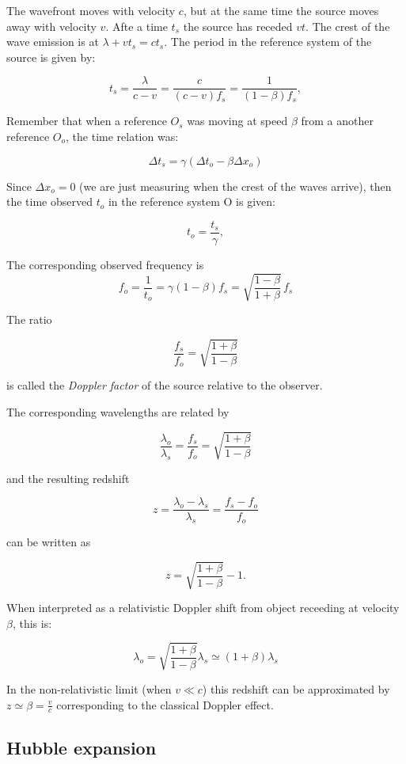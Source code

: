 \documentclass[
  letterpaper,
  DIV=11,
  numbers=noendperiod]{scrreprt}
\begin{document}
The wavefront moves with velocity \(c\), but at the same time the source
moves away with velocity \(v\). Afte a time \(t_s\) the source has
receded \(vt\). The crest of the wave emission is at
\(\lambda+v t_s=ct_s\). The period in the reference system of the source
is given by:

\[t_s = \frac{\lambda}{c-v} = \frac{c}{(c-v)f_s} = \frac{1}{(1-\beta)f_s},\]

Remember that when a reference \(O_s\) was moving at speed \(\beta\)
from a another reference \(O_{o}\), the time relation was:

\[\Delta t_s = \gamma(\Delta t_{o} - \beta \Delta x_{o})\]

Since \(\Delta x_{o} =0\) (we are just measuring when the crest of the
waves arrive), then the time observed \(t_{o}\) in the reference system
O is given:

\[t_o = \frac{t_s}{\gamma},\]

The corresponding observed frequency is
\[f_o = \frac{1}{t_o} = \gamma (1-\beta) f_s = \sqrt{\frac{1-\beta}{1+\beta}}\,f_s\]

The ratio

\[\frac{f_s}{f_o} = \sqrt{\frac{1+\beta}{1-\beta}}\]

is called the \emph{Doppler factor} of the source relative to the
observer.

The corresponding wavelengths are related by

\[\frac{\lambda_o}{\lambda_s} = \frac{f_s}{f_o} = \sqrt{\frac{1+\beta}{1-\beta}}\]

and the resulting redshift

\[z = \frac{\lambda_o - \lambda_s}{\lambda_s} = \frac{f_s - f_o}{f_o}\]

can be written as

\[z = \sqrt{\frac{1+\beta}{1-\beta}} - 1.\]

When interpreted as a relativistic Doppler shift from object receeding
at velocity \(\beta\), this is:

\[\lambda_o = \sqrt{\frac{1+\beta}{1-\beta}}\lambda_s \simeq (1+\beta)\lambda_s\]

In the non-relativistic limit (when \(v \ll c\)) this redshift can be
approximated by \(z \simeq \beta = \frac{v}{c}\) corresponding to the
classical Doppler effect.

\subsection*{Hubble expansion}\label{hubble-expansion}
\end{document}
